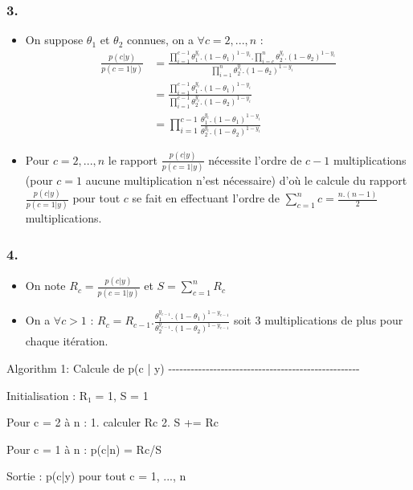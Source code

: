 \documentclass[
]{article}
\newenvironment{Shaded}{\begin{snugshade}}{\end{snugshade}}
\newcommand{\NormalTok}[1]{#1}
\providecommand{\tightlist}{%
  \setlength{\itemsep}{0pt}\setlength{\parskip}{0pt}}
\begin{document}
\subsubsection{3.}\label{section-2}

\begin{itemize}
\tightlist
\item
  On suppose \(\theta_1\) et \(\theta_2\) connues, on a
  \(\forall  c = 2, ..., n\) : \[
  \begin{align}
  \frac{p(c|y)}{p(c=1|y)} &= \frac{\prod_{i=1}^{c-1} \theta_1^{y_i}.(1-\theta_1)^{1-y_i} . \prod_{i=c}^n \theta_2^{y_i}.(1-\theta_2)^{1-y_i}}{\prod_{i=1}^n \theta_2^{y_i}.(1-\theta_2)^{1-y_i}} \\
                        &= \frac{\prod_{i=1}^{c-1} \theta_1^{y_i}.(1-\theta_1)^{1-y_i}}{\prod_{i=1}^{c-1} \theta_2^{y_i}.(1-\theta_2)^{1-y_i}} \\
                        &= \prod_{i=1}^{c-1} \frac{\theta_1^{y_i}.(1-\theta_1)^{1-y_i}}{\theta_2^{y_i}.(1-\theta_2)^{1-y_i}}
  \end{align}
  \]
\item
  Pour \(c = 2, ...,n\) le rapport \(\frac{p(c|y)}{p(c=1|y)}\) nécessite
  l'ordre de \(c-1\) multiplications (pour \(c = 1\) aucune
  multiplication n'est nécessaire) d'où le calcule du rapport
  \(\frac{p(c|y)}{p(c=1|y)}\) pour tout \(c\) se fait en effectuant
  l'ordre de \(\sum_{c=1}^n c = \frac{n.(n-1)}2\) multiplications.
\end{itemize}

\subsubsection{4.}\label{section-3}

\begin{itemize}
\item
  On note \(R_c = \frac{p(c|y)}{p(c=1|y)}\) et \(S = \sum_{c=1}^n R_c\)
\item
  On a \(\forall c>1\) :
  \(R_c = R_{c-1}.\frac{\theta_1^{y_{c-1}}.(1-\theta_1)^{1-y_{c-1}}}{\theta_2^{y_{c-1}}.(1-\theta_2)^{1-y_{c-1}}}\)
  soit \(3\) multiplications de plus pour chaque itération.
\end{itemize}

\begin{Shaded}
\begin{Highlighting}[]
\NormalTok{Algorithm 1: Calcule de p(c | y)}
\NormalTok{{-}{-}{-}{-}{-}{-}{-}{-}{-}{-}{-}{-}{-}{-}{-}{-}{-}{-}{-}{-}{-}{-}{-}{-}{-}{-}{-}{-}{-}{-}{-}{-}{-}{-}{-}{-}{-}{-}{-}{-}{-}{-}{-}{-}{-}{-}{-}{-}{-}{-}{-}}

\NormalTok{Initialisation :}
\NormalTok{    R₁ = 1, S = 1}

\NormalTok{Pour c = 2 à n :}
\NormalTok{    1. calculer Rc}
\NormalTok{    2. S += Rc}

\NormalTok{Pour c = 1 à n :}
\NormalTok{    p(c|n) = Rc/S}

\NormalTok{Sortie :}
\NormalTok{    p(c|y) pour tout c = 1, ..., n}
\end{Highlighting}
\end{Shaded}
\end{document}
